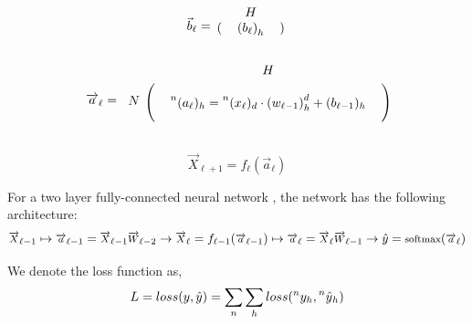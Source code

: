 \documentclass[12pt,a4paper]{article}%
\theoremstyle{definition}
\theoremstyle{plain}
\numberwithin{equation}{section}
\newcounter{subsubsubsection}[subsubsection]
\begin{document}
\begin{equation*}
\vec{b}_{\ell} =  \begin{blockarray}{ccc}
    \multicolumn{3}{c}{$H$}  \\
\begin{block}{(ccc)}
    &    {(b_{\ell})}_{h}     &    \\
\end{block}
\end{blockarray}
\end{equation*}

\begin{equation*}
\overrightarrow{a}_{\ell} =  \begin{blockarray}{cccc}
                                     & \multicolumn{3}{c}{$H$}  \\
\begin{block}{c(ccc)}
\multirow{3}{*}{$N$} &    &       &    \\
  					                 &      & \prescript{n}{}{(a_{\ell})}_{h} =  \prescript{n}{}{(x_{\ell})}_{d} \cdot {(w_{\ell-1})}^{d}_{h}  + (b_{\ell-1})_{h}    &     \\
			     	                 &      &       &       \\
\end{block}
\end{blockarray}
\end{equation*}

\begin{equation}
\overrightarrow{X}_{\ell+1} = f_{\ell}(\overrightarrow{a}_{\ell} )
\end{equation}


For a two layer fully-connected neural network ,  the network has the following architecture: 
\begin{equation}
\footnotesize
\overrightarrow{X}_{\ell-1} \mapsto \overrightarrow{a}_{\ell-1} = \overrightarrow{X}_{\ell-1} \overrightarrow{W}_{\ell-2} \rightarrow 
\overrightarrow{X}_{\ell} = f_{\ell-1}(\overrightarrow{a}_{\ell-1}) \mapsto \overrightarrow{a}_{\ell} = \overrightarrow{X}_{\ell} \overrightarrow{W}_{\ell-1} \rightarrow \hat{y} = \text{softmax}(\overrightarrow{a}_{\ell})
\end{equation}

We denote the loss function as,
\begin{equation}
L = loss(y, \hat{y}) = \sum\limits_{n} \sum\limits_{h} loss(\prescript{n}{}{y_{h}}, \prescript{n}{}{\hat{y}}_{h})
\end{equation}
\end{document}
